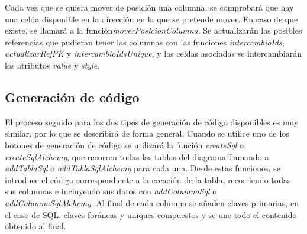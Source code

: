 Cada vez que se quiera mover de posición una columna, se comprobará que hay una celda disponible en la dirección en la que se pretende mover. En caso de que existe, se llamará a la función\emph{moverPosicionColumna}. Se actualizarán las posibles referencias que pudieran tener las columnas con las funciones \emph{intercambioIds}, \emph{actualizarRefPK} y \emph{intercambioIdsUnique}, y las celdas asociadas se intercambiarán los atributos \textit{value} y \textit{style}.


\subsection{Generación de código}

El proceso seguido para los dos tipos de generación de código disponibles es muy similar, por lo que se describirá de forma general. Cuando se utilice uno de los botones de generación de código se utilizará la función \emph{createSql} o \emph{createSqlAlchemy}, que recorren todas las tablas del diagrama llamando a \emph{addTablaSql} o \emph{addTablaSqlAlchemy} para cada una. Desde estas funciones, se introduce el código correspondiente a la creación de la tabla, recorriendo todas sus columnas e incluyendo sus datos con \emph{addColumnaSql} o \emph{addColumnaSqlAlchemy}. Al final de cada columna se añaden claves primarias, en el caso de SQL, claves foráneas y uniques compuestos y se une todo el contenido obtenido al final.
